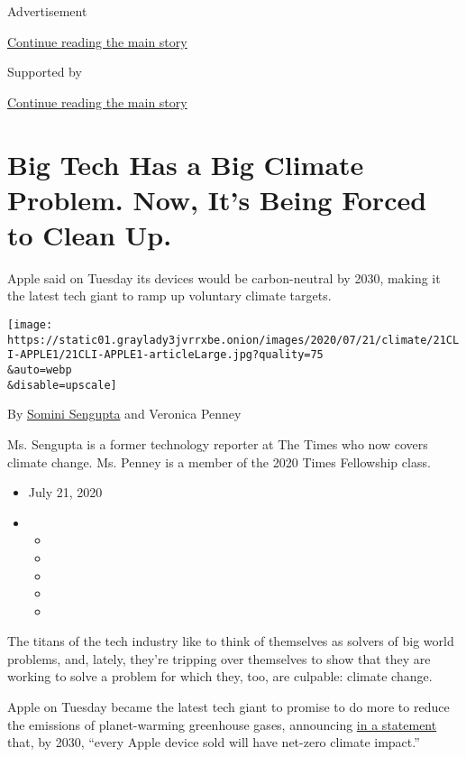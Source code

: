 Advertisement

\protect\hyperlink{after-top}{Continue reading the main story}

Supported by

\protect\hyperlink{after-sponsor}{Continue reading the main story}

\hypertarget{big-tech-has-a-big-climate-problem-now-its-being-forced-to-clean-up}{%
\section{Big Tech Has a Big Climate Problem. Now, It's Being Forced to
Clean
Up.}\label{big-tech-has-a-big-climate-problem-now-its-being-forced-to-clean-up}}

Apple said on Tuesday its devices would be carbon-neutral by 2030,
making it the latest tech giant to ramp up voluntary climate targets.

\texttt{[image: https://static01.graylady3jvrrxbe.onion/images/2020/07/21/climate/21CLI-APPLE1/21CLI-APPLE1-articleLarge.jpg?quality=75\\\&auto=webp\\\&disable=upscale]}

By \href{https://www.nytimes3xbfgragh.onion/by/somini-sengupta}{Somini
Sengupta} and Veronica Penney

Ms. Sengupta is a former technology reporter at The Times who now covers
climate change. Ms. Penney is a member of the 2020 Times Fellowship
class.

\begin{itemize}
\item
  July 21, 2020
\item
  \begin{itemize}
  \item
  \item
  \item
  \item
  \item
  \end{itemize}
\end{itemize}

The titans of the tech industry like to think of themselves as solvers
of big world problems, and, lately, they're tripping over themselves to
show that they are working to solve a problem for which they, too, are
culpable: climate change.

Apple on Tuesday became the latest tech giant to promise to do more to
reduce the emissions of planet-warming greenhouse gases, announcing
\href{https://www.apple.com/newsroom/2020/07/apple-commits-to-be-100-percent-carbon-neutral-for-its-supply-chain-and-products-by-2030/}{in
a statement} that, by 2030, ``every Apple device sold will have net-zero
climate impact.''

